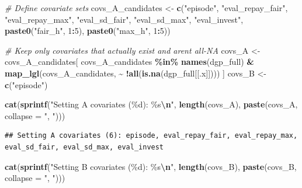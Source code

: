 \documentclass[
]{article}
\newenvironment{Shaded}{\begin{snugshade}}{\end{snugshade}}
\newcommand{\AttributeTok}[1]{\textcolor[rgb]{0.13,0.29,0.53}{#1}}
\newcommand{\CommentTok}[1]{\textcolor[rgb]{0.56,0.35,0.01}{\textit{#1}}}
\newcommand{\DecValTok}[1]{\textcolor[rgb]{0.00,0.00,0.81}{#1}}
\newcommand{\FunctionTok}[1]{\textcolor[rgb]{0.13,0.29,0.53}{\textbf{#1}}}
\newcommand{\NormalTok}[1]{#1}
\newcommand{\OtherTok}[1]{\textcolor[rgb]{0.56,0.35,0.01}{#1}}
\newcommand{\SpecialCharTok}[1]{\textcolor[rgb]{0.81,0.36,0.00}{\textbf{#1}}}
\newcommand{\StringTok}[1]{\textcolor[rgb]{0.31,0.60,0.02}{#1}}
\begin{document}
\begin{Shaded}
\begin{Highlighting}[]
\CommentTok{\# Define covariate sets}
\NormalTok{covs\_A\_candidates }\OtherTok{\textless{}{-}} \FunctionTok{c}\NormalTok{(}\StringTok{"episode"}\NormalTok{,}
                        \StringTok{"eval\_repay\_fair"}\NormalTok{, }\StringTok{"eval\_repay\_max"}\NormalTok{,}
                        \StringTok{"eval\_sd\_fair"}\NormalTok{, }\StringTok{"eval\_sd\_max"}\NormalTok{, }\StringTok{"eval\_invest"}\NormalTok{,}
                        \FunctionTok{paste0}\NormalTok{(}\StringTok{"fair\_h"}\NormalTok{, }\DecValTok{1}\SpecialCharTok{:}\DecValTok{5}\NormalTok{), }\FunctionTok{paste0}\NormalTok{(}\StringTok{"max\_h"}\NormalTok{, }\DecValTok{1}\SpecialCharTok{:}\DecValTok{5}\NormalTok{))}

\CommentTok{\# Keep only covariates that actually exist and aren\textquotesingle{}t all{-}NA}
\NormalTok{covs\_A }\OtherTok{\textless{}{-}}\NormalTok{ covs\_A\_candidates[}
\NormalTok{  covs\_A\_candidates }\SpecialCharTok{\%in\%} \FunctionTok{names}\NormalTok{(dgp\_full) }\SpecialCharTok{\&}
    \FunctionTok{map\_lgl}\NormalTok{(covs\_A\_candidates, }\SpecialCharTok{\textasciitilde{}} \SpecialCharTok{!}\FunctionTok{all}\NormalTok{(}\FunctionTok{is.na}\NormalTok{(dgp\_full[[.x]])))}
\NormalTok{]}
\NormalTok{covs\_B }\OtherTok{\textless{}{-}} \FunctionTok{c}\NormalTok{(}\StringTok{"episode"}\NormalTok{)}

\FunctionTok{cat}\NormalTok{(}\FunctionTok{sprintf}\NormalTok{(}\StringTok{"Setting A covariates (\%d): \%s}\SpecialCharTok{\textbackslash{}n}\StringTok{"}\NormalTok{,}
            \FunctionTok{length}\NormalTok{(covs\_A), }\FunctionTok{paste}\NormalTok{(covs\_A, }\AttributeTok{collapse =} \StringTok{", "}\NormalTok{)))}
\end{Highlighting}
\end{Shaded}

\begin{verbatim}
## Setting A covariates (6): episode, eval_repay_fair, eval_repay_max, eval_sd_fair, eval_sd_max, eval_invest
\end{verbatim}

\begin{Shaded}
\begin{Highlighting}[]
\FunctionTok{cat}\NormalTok{(}\FunctionTok{sprintf}\NormalTok{(}\StringTok{"Setting B covariates (\%d): \%s}\SpecialCharTok{\textbackslash{}n}\StringTok{"}\NormalTok{,}
            \FunctionTok{length}\NormalTok{(covs\_B), }\FunctionTok{paste}\NormalTok{(covs\_B, }\AttributeTok{collapse =} \StringTok{", "}\NormalTok{)))}
\end{Highlighting}
\end{Shaded}
\end{document}
